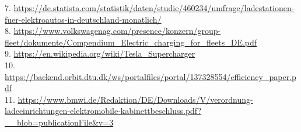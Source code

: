 \begin{parcolumns}[colwidths={1=2.5 cm, 2=12 cm}]{2}
{7. \url{https://de.statista.com/statistik/daten/studie/460234/umfrage/ladestationen-fuer-elektroautos-in-deutschland-monatlich/} \\
8. \url{https://www.volkswagenag.com/presence/konzern/group-fleet/dokumente/Compendium_Electric_charging_for_fleets_DE.pdf} \\
9. \url{https://en.wikipedia.org/wiki/Tesla_Supercharger} \\
10. \url{https://backend.orbit.dtu.dk/ws/portalfiles/portal/137328554/efficiency_paper.pdf} \\
11. \url{https://www.bmwi.de/Redaktion/DE/Downloads/V/verordnung-ladeeinrichtungen-elektromobile-kabinettbeschluss.pdf?__blob=publicationFile&v=3} \\
\\
}

\end{parcolumns}
\clearpage